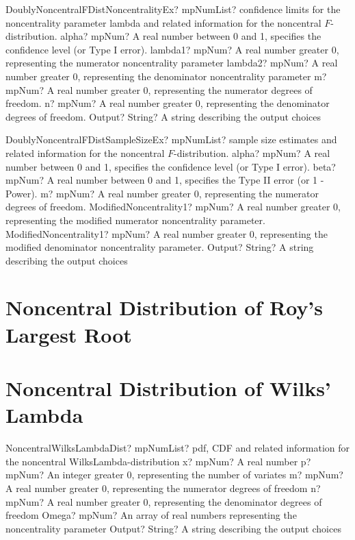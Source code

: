 \documentclass[12pt,a4paper,openany]{book}
\begin{document}
\begin{mpFunctionsExtract}
\mpFunctionSixNotImplemented
{DoublyNoncentralFDistNoncentralityEx? mpNumList? confidence limits for the noncentrality parameter lambda and related information for the noncentral $F$-distribution.}
{alpha? mpNum? A real number between 0 and 1, specifies the confidence level (or Type I error).}
{lambda1? mpNum? A real number greater 0, representing the numerator noncentrality parameter}
{lambda2? mpNum? A real number greater 0, representing the denominator noncentrality parameter}
{m? mpNum? A real number greater 0, representing the numerator  degrees of freedom.}
{n? mpNum? A real number greater 0, representing the denominator degrees of freedom.}
{Output? String? A string describing the output choices}
\end{mpFunctionsExtract}

\begin{mpFunctionsExtract}
\mpFunctionSixNotImplemented
{DoublyNoncentralFDistSampleSizeEx? mpNumList? sample size estimates and related information for the noncentral $F$-distribution.}
{alpha? mpNum? A real number between 0 and 1, specifies the confidence level (or Type I error).}
{beta? mpNum?  A real number between 0 and 1, specifies the Type II error (or 1 - Power).}
{m? mpNum? A real number greater 0, representing the numerator  degrees of freedom.}
{ModifiedNoncentrality1? mpNum? A real number greater 0, representing the modified numerator noncentrality parameter.}
{ModifiedNoncentrality1? mpNum? A real number greater 0, representing the modified denominator noncentrality parameter.}
{Output? String? A string describing the output choices}
\end{mpFunctionsExtract}

\section{Noncentral Distribution of Roy's Largest Root}

\section{Noncentral Distribution of Wilks' Lambda}

\begin{mpFunctionsExtract}
\mpFunctionSixNotImplemented
{NoncentralWilksLambdaDist? mpNumList? pdf, CDF and related information for the noncentral WilksLambda-distribution}
{x? mpNum? A real number}
{p? mpNum? An integer greater 0, representing the number of variates}
{m? mpNum? A real number greater 0, representing the numerator  degrees of freedom}
{n? mpNum? A real number greater 0, representing the denominator degrees of freedom}
{Omega? mpNum? An array of real numbers representing the noncentrality parameter}
{Output? String? A string describing the output choices}
\end{mpFunctionsExtract}
\end{document}
